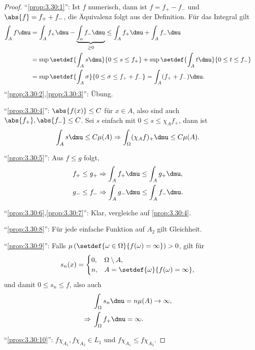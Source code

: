 \begin{proof}
``\ref{prop:3.30:1}'': Ist $f$ numerisch, dann ist $f = f_+ -f_-$ und $\abs{f} =
f_+ + f_-$, die Äquivalenz folgt aus der Definition. Für das Integral gilt
\begin{align*}
\int_A f\dmu &= \int_A f_+ \dmu - \underbrace{\int_a f_- \dmu}_{\ge 0}
\le \int_A f_+\dmu + \int_A f_- \dmu  \\ &= \sup\setdef{\int_A s\dmu}{0\le s\le
f_+} + \sup\setdef{\int_A t \dmu}{0\le t\le f_-} \\ &= \sup\setdef{\int_A
\sigma}{0\le\sigma\le f_++f_-} = \int_A (f_+ + f_-)\dmu.
\end{align*}
``\ref{prop:3.30:2},\ref{prop:3.30:3}'': Übung.

``\ref{prop:3.30:4}'': $\abs{f(x)} \le C$ für $x\in A$, also sind auch
$\abs{f_+},\abs{f_-}\le C$. Sei $s$ einfach mit $0\le s\le \chi_A f_+$, dann ist
\begin{align*}
\int_A s\dmu \le C\mu(A) \Rightarrow \int_\Omega (\chi_A f)_+ \dmu \le C\mu(A).
\end{align*}

``\ref{prop:3.30:5}'': Aus $f\le g$ folgt,
\begin{align*}
&f_+\le g_+ \Rightarrow \int_A f_+ \dmu \le \int_A g_+ \dmu,\\
&g_-\le f_- \Rightarrow \int_A g_- \dmu \le \int_A f_-\dmu.
\end{align*}

``\ref{prop:3.30:6},\ref{prop:3.30:7}'': Klar, vergleiche auf
\ref{prop:3.30:4}.

``\ref{prop:3.30:8}'': Für jede einfache Funktion auf $A_2$ gilt Gleichheit.

``\ref{prop:3.30:9}'': Falls
$\mu\left(\setdef{\omega\in\Omega}{f(\omega)=\infty}\right)>0$, gilt für
\begin{align*}
s_n(x) = \begin{cases}
0, & \Omega\setminus A,\\
n, & A=\setdef{\omega}{f(\omega)=\infty},
\end{cases}
\end{align*}
und damit $0\le s_n\le f$, also auch
\begin{align*}
&\int_\Omega s_n\dmu = n\mu(A) \to \infty,\\
\Rightarrow\;&\int_\Omega f_+\dmu = \infty.
\end{align*}

``\ref{prop:3.30:10}'': $f\chi_{A_1}, f\chi_{A_2}\in L_1$ und $f\chi_{A_1}\le
f\chi_{A_2}$.
\end{proof}

